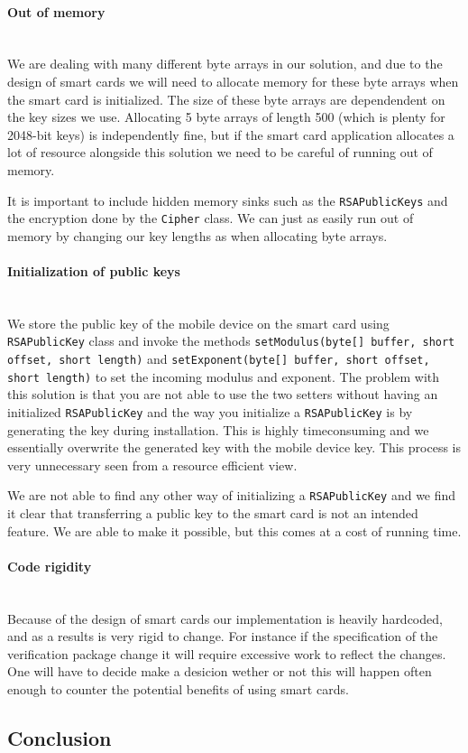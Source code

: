 \paragraph{Out of memory}\mbox{}\\
We are dealing with many different byte arrays in our solution, and due to the design of smart cards we will need to allocate memory for these byte arrays when the smart card is initialized. The size of these byte arrays are dependendent on the key sizes we use. Allocating 5 byte arrays of length 500 (which is plenty for 2048-bit keys) is independently fine, but if the smart card application allocates a lot of resource alongside this solution we need to be careful of running out of memory.

It is important to include hidden memory sinks such as the \texttt{RSAPublicKeys} and the encryption done by the \texttt{Cipher} class. We can just as easily run out of memory by changing our key lengths as when allocating byte arrays.

\paragraph{Initialization of public keys}\mbox{}\\
We store the public key of the mobile device on the smart card using \texttt{RSAPublicKey} class and invoke the methods \texttt{setModulus(byte[] buffer, short offset, short length)} and \texttt{setExponent(byte[] buffer, short offset, short length)} to set the incoming modulus and exponent. The problem with this solution is that you are not able to use the two setters without having an initialized \texttt{RSAPublicKey} and the way you initialize a \texttt{RSAPublicKey} is by generating the key during installation. This is highly timeconsuming and we essentially overwrite the generated key with the mobile device key. This process is very unnecessary seen from a resource efficient view.

We are not able to find any other way of initializing a \texttt{RSAPublicKey} and we find it clear that transferring a public key to the smart card is not an intended feature. We are able to make it possible, but this comes at a cost of running time.

\paragraph{Code rigidity}\mbox{}\\
Because of the design of smart cards our implementation is heavily hardcoded, and as a results is very rigid to change. For instance if the specification of the verification package change it will require excessive work to reflect the changes. One will have to decide make a desicion wether or not this will happen often enough to counter the potential benefits of using smart cards.

\subsection{Conclusion}
